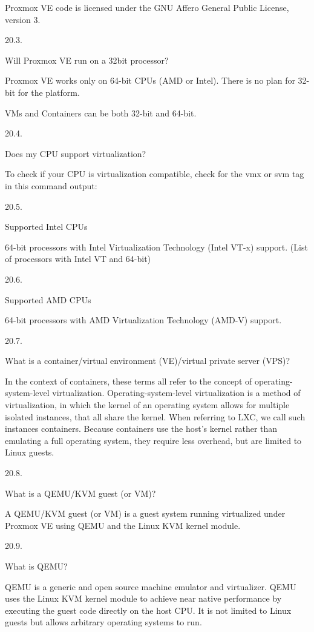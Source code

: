 Proxmox VE code is licensed under the GNU Affero General Public License, version 3.

20.3.

Will Proxmox VE run on a 32bit processor?

Proxmox VE works only on 64-bit CPUs (AMD or Intel). There is no plan for 32-bit for the platform.

VMs and Containers can be both 32-bit and 64-bit.

20.4.

Does my CPU support virtualization?

To check if your CPU is virtualization compatible, check for the vmx or svm tag in this command output:

20.5.

Supported Intel CPUs

64-bit processors with Intel Virtualization Technology (Intel VT-x) support. (List of processors with Intel VT and 64-bit)

20.6.

Supported AMD CPUs

64-bit processors with AMD Virtualization Technology (AMD-V) support.

20.7.

What is a container/virtual environment (VE)/virtual private server (VPS)?

In the context of containers, these terms all refer to the concept of operating-system-level virtualization. Operating-system-level virtualization is a method of virtualization, in which the kernel of an operating system allows for multiple isolated instances, that all share the kernel. When referring to LXC, we call such instances containers. Because containers use the host’s kernel rather than emulating a full operating system, they require less overhead, but are limited to Linux guests.

20.8.

What is a QEMU/KVM guest (or VM)?

A QEMU/KVM guest (or VM) is a guest system running virtualized under Proxmox VE using QEMU and the Linux KVM kernel module.

20.9.

What is QEMU?

QEMU is a generic and open source machine emulator and virtualizer. QEMU uses the Linux KVM kernel module to achieve near native performance by executing the guest code directly on the host CPU. It is not limited to Linux guests but allows arbitrary operating systems to run.

